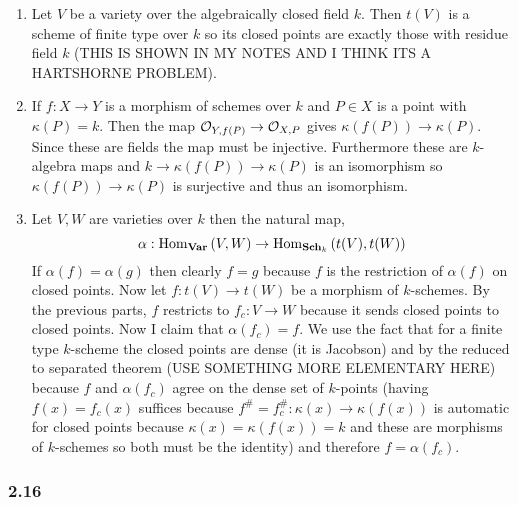 \documentclass[12pt]{article}
\begin{document}
\begin{enumerate}
\item Let $V$ be a variety over the algebraically closed field $k$. Then $t(V)$ is a scheme of finite type over $k$ so its closed points are exactly those with residue field $k$ (THIS IS SHOWN IN MY NOTES AND I THINK ITS A HARTSHORNE PROBLEM).

\item If $f : X \to Y$ is a morphism of schemes over $k$ and $P \in X$ is a point with $\kappa(P) = k$. Then the map $\mathcal{O}_{Y, f(P)} \to \mathcal{O}_{X, P}$ gives $\kappa(f(P)) \to \kappa(P)$. Since these are fields the map must be injective. Furthermore these are $k$-algebra maps and $k \to \kappa(f(P)) \to \kappa(P)$ is an isomorphism so $\kappa(f(P)) \to \kappa(P)$ is surjective and thus an isomorphism. 

\item Let $V, W$ are varieties over $k$ then the natural map,
\[ \alpha : \mathrm{Hom}_{\mathbf{Var}} \left( V, W \right) \to \mathrm{Hom}_{\mathbf{Sch}_k} \left( t(V), t(W) \right) \]
If $\alpha(f) = \alpha(g)$ then clearly $f = g$ because $f$ is the restriction of $\alpha(f)$ on closed points. Now let $f : t(V) \to t(W)$ be a morphism of $k$-schemes. By the previous parts, $f$ restricts to $f_c : V \to W$ because it sends closed points to closed points. Now I claim that $\alpha(f_c) = f$. We use the fact that for a finite type $k$-scheme the closed points are dense (it is Jacobson) and by the reduced to separated theorem (USE SOMETHING MORE ELEMENTARY HERE) because $f$ and $\alpha(f_c)$ agree on the dense set of $k$-points (having $f(x) = f_c(x)$ suffices because $f^\# = f_c^\# : \kappa(x) \to \kappa(f(x))$ is automatic for closed points because $\kappa(x) = \kappa(f(x)) = k$ and these are morphisms of $k$-schemes so both must be the identity) and therefore $f = \alpha(f_c)$.
\end{enumerate}

\subsubsection{2.16}
\end{document}
